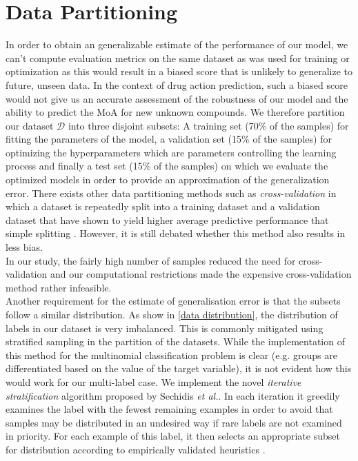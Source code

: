 \documentclass[bsc,frontabs,twoside,singlespacing,parskip,deptreport]{infthesis}     %
\let\Oldsection\section
\renewcommand{\section}{\FloatBarrier\Oldsection}
\begin{document}
\section{Data Partitioning}
In order to obtain an generalizable estimate of the performance of our model, we can't compute evaluation metrics on the same dataset as was used for training or optimization as this would result in a biased score that is unlikely to generalize to future, unseen data. In the context of drug action prediction, such a biased score would not give us an accurate assessment of the robustness of our model and the ability to predict the MoA for new unknown compounds. 
We therefore partition our dataset \(\mathscr{D}\) into three disjoint subsets: A training set (70\% of the samples) for fitting the parameters of the model, a validation set (15\% of the samples) for optimizing the hyperparameters which are parameters controlling the learning process and finally a test set (15\% of the samples) on which we evaluate the optimized models in order to provide an approximation of the generalization error.
There exists other data partitioning methods such as \textit{cross-validation} in which a dataset is repeatedly split into a training dataset and a validation dataset that have shown to yield higher average predictive performance that simple splitting \cite{schaffer_selecting_1993}. However, it is still debated whether this method also results in less bias. \\
In our study, the fairly high number of samples reduced the need for cross-validation and our computational restrictions made the expensive cross-validation method rather infeasible. \\
Another requirement for the estimate of generalisation error is that the subsets follow a similar distribution. As show in \ref{data distribution}, the distribution of labels in our dataset is very imbalanced. This is commonly mitigated using stratified sampling in the partition of the datasets. While the implementation of this method for the multinomial classification problem is clear (e.g. groups are differentiated based on the value of the target variable), it is not evident how this would work for our multi-label case. We implement the novel \textit{iterative stratification} algorithm proposed by Sechidis \textit{et al.}. In each iteration it greedily examines the label with the fewest remaining examples in order to avoid that samples may be distributed in an undesired way if rare labels are not examined in priority. For each example of this label, it then selects an appropriate subset for distribution according to empirically validated heuristics \cite{sechidis_stratication_nodate}.
\end{document}
